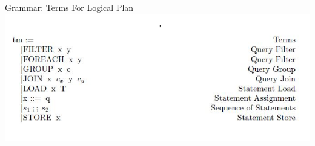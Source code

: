 \begin{frame}{Grammar: Terms For Logical Plan}
\centering
\includegraphics[scale=0.6]{Images/Grammar/Terms.JPG} 
\end{frame}


